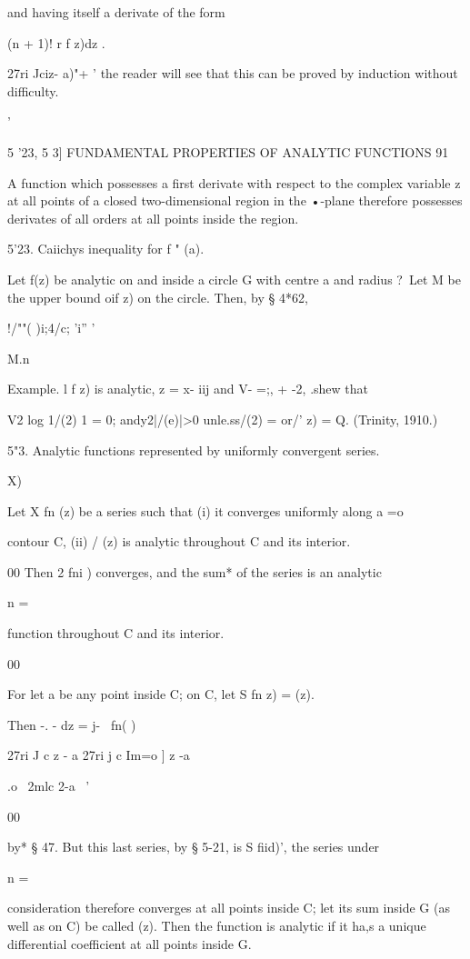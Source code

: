 {{and having itself a derivate of the form

(n + 1)! r f z)dz .

27ri Jciz- a)"+ ' the reader will see that this can be proved by
induction without difficulty.

 '

5 '23, 5 3] FUNDAMENTAL PROPERTIES OF ANALYTIC FUNCTIONS 91

A function which possesses a first derivate with respect to the
complex variable z at all points of a closed two-dimensional region in
the •-plane therefore possesses derivates of all orders at all points
inside the region.

5'23. Caiichys inequality for f " (a).

Let f(z) be analytic on and inside a circle G with centre a and radius
?\ Let M be the upper bound oif z) on the circle. Then, by § 4*62,

!/""( )i;4/c; 'i'' '

M.n\

Example. l f z) is analytic, z = x- iij and V- =;, + -2, .shew that

V2 log 1/(2) 1 = 0; andy2|/(e)|>0 unle.ss/(2) = or/' z) = Q. (Trinity,
1910.)

5"3. Analytic functions represented by uniformly convergent series.

 X)

Let X fn (z) be a series such that (i) it converges uniformly along a
=o

contour C, (ii) / (z) is analytic throughout C and its interior.

00 Then 2 fni ) converges, and the sum* of the series is an analytic

n =

function throughout C and its interior.

00

For let a be any point inside C; on C, let S fn z) = (z).

Then -. - dz = j- \ fn( )\

27ri J c z - a 27ri j c Im=o ] z -a

 .o \ 2mlc 2-a \ '

00

by* § 47. But this last series, by § 5-21, is S fiid)', the series
under

n =

consideration therefore converges at all points inside C; let its sum
inside G (as well as on C) be called (z). Then the function is
analytic if it ha,s a unique differential coefficient at all points
inside G.

}}
